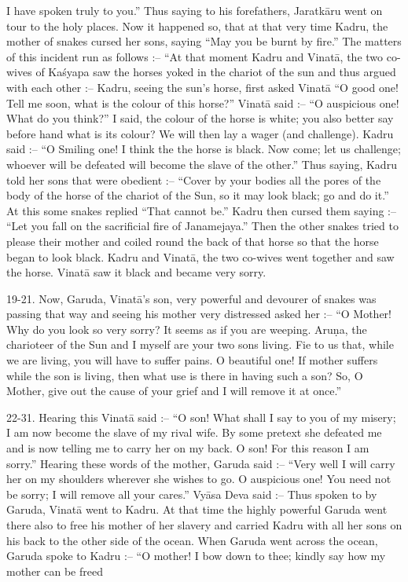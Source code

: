 I have spoken truly to you.'' Thus saying to his forefathers, Jaratk\=aru went on tour to the holy places. Now it happened so, that at that very time Kadru, the mother of snakes cursed her sons, saying ``May you be burnt by fire.'' The matters of this incident run as follows :-- ``At that moment Kadru and Vinat\=a, the two co-wives of Ka\'syapa saw the horses yoked in the chariot of the sun and thus argued with each other :-- Kadru, seeing the sun's horse, first asked Vinat\=a ``O good one! Tell me soon, what is the colour of this horse?'' Vinat\=a said :-- ``O auspicious one! What do you think?'' I said, the colour of the horse is white; you also better say before hand what is its colour? We will then lay a wager (and challenge). Kadru said :-- ``O Smiling one! I think the the horse is black. Now come; let us challenge; whoever will be defeated will become the slave of the other.'' Thus saying, Kadru told her sons that were obedient :-- ``Cover by your bodies all the pores of the body of the horse of the chariot of the Sun, so it may look black; go and do it.'' At this some snakes replied ``That cannot be.'' Kadru then cursed them saying :-- ``Let you fall on the sacrificial fire of Janamejaya.'' Then the other snakes tried to please their mother and coiled round the back of that horse so that the horse began to look black. Kadru and Vinat\=a, the two co-wives went together and saw the horse. Vinat\=a saw it black and became very sorry.

19-21. Now, Garuda, Vinat\=a's son, very powerful and devourer of snakes was passing that way and seeing his mother very distressed asked her :-- ``O Mother! Why do you look so very sorry? It seems as if you are weeping. Aru\d{n}a, the charioteer of the Sun and I myself are your two sons living. Fie to us that, while we are living, you will have to suffer pains. O beautiful one! If mother suffers while the son is living, then what use is there in having such a son? So, O Mother, give out the cause of your grief and I will remove it at once.''

22-31. Hearing this Vinat\=a said :-- ``O son! What shall I say to you of my misery; I am now become the slave of my rival wife. By some pretext she defeated me and is now telling me to carry her on my back. O son! For this reason I am sorry.'' Hearing these words of the mother, Garuda said :-- ``Very well I will carry her on my shoulders wherever she wishes to go. O auspicious one! You need not be sorry; I will remove all your cares.'' Vy\=asa Deva said :-- Thus spoken to by Garuda, Vinat\=a went to Kadru. At that time the highly powerful Garuda went there also to free his mother of her slavery and carried Kadru with all her sons on his back to the other side of the ocean. When Garuda went across the ocean, Garuda spoke to Kadru :-- ``O mother! I bow down to thee; kindly say how my mother can be freed

